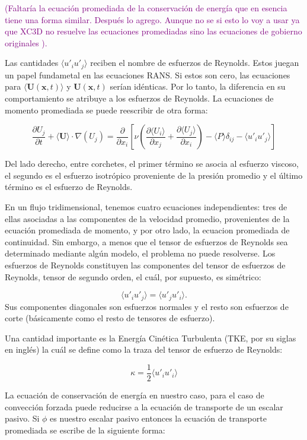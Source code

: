 \textcolor{purple}{(Faltaría la ecuación promediada de la conservación de energía que en esencia tiene una forma similar. Después lo agrego. Aunque no se si esto lo voy a usar ya que XC3D no resuelve las ecuaciones promediadas sino las ecuaciones de gobierno originales ).}

Las cantidades $ \langle u'_i u'_j \rangle$ reciben el nombre de esfuerzos de Reynolds. Estos juegan un papel fundametal en las ecuaciones RANS. Si estos son cero, las ecuaciones para $\langle \mathbf{U}(\mathbf{x},t) \rangle$ y $\mathbf{U}(\mathbf{x},t)$ serían idénticas. Por lo tanto, la diferencia en su comportamiento se atribuye a los esfuerzos de Reynolds. La ecuaciones de momento promediada se puede reescribir de otra forma:

$$\frac{\partial U_j }{\partial t} + \langle \mathbf{U} \rangle \cdot \nabla (U_j) = \frac{\partial}{\partial x_i} \left[ \nu \left( \frac{\partial \langle U_i \rangle }{\partial x_j} + \frac{\partial \langle U_j \rangle }{\partial x_i} \right) - \langle P \rangle \delta_{ij} - \langle u'_i u'_j \rangle \right] $$

Del lado derecho, entre corchetes, el primer término se asocia al esfuerzo viscoso, el segundo es el esfuerzo isotrópico proveniente de la presión promedio y el último término es el esfuerzo de Reynolds.

En un flujo tridimensional, tenemos cuatro ecuaciones independientes: tres de ellas asociadas a las componentes de la velocidad promedio, provenientes de la ecuación promediada de momento, y por otro lado, la ecuacion promediada de continuidad. Sin embargo, a menos que el tensor de esfuerzos de Reynolds sea determinado mediante algún modelo, el problema no puede resolverse. Los esfuerzos de Reynolds constituyen las componentes del tensor de esfuerzos de Reynolds, tensor de segundo orden, el cuál, por supuesto, es simétrico:

$$\langle u'_i u'_j \rangle = \langle u'_j u'_i \rangle.$$ 
Sus componentes diagonales son esfuerzos normales y el resto son esfuerzos de corte (básicamente como el resto de tensores de esfuerzo).

Una cantidad importante es la Energía Cinética Turbulenta (TKE, por su siglas en inglés) la cuál se define como la traza  del tensor de esfuerzo de Reynolds:

$$\kappa = \frac{1}{2} \langle u'_i u'_i \rangle$$

La ecuación de conservación de energía en nuestro caso, para el caso de convección forzada puede reducirse a la ecuación de transporte de un escalar pasivo. Si $\phi$ es nuestro escalar pasivo entonces la ecuación de transporte promediada se escribe de la siguiente forma:

